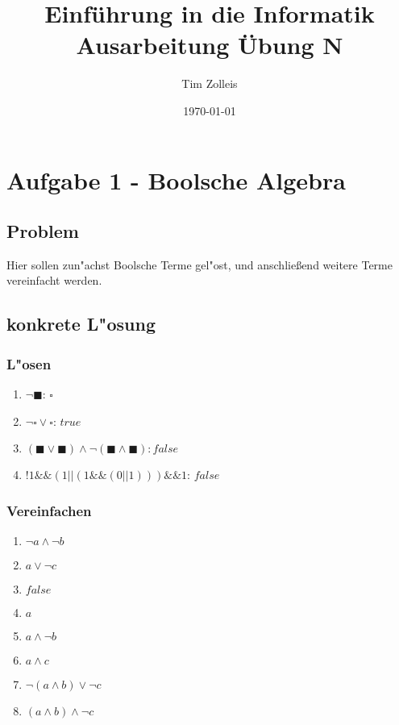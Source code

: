 \documentclass[a4paper,11pt,titlepage]{article}
\begin{document}
    \title{Einf\"uhrung in die Informatik\\
    Ausarbeitung \"Ubung N}


    \author{Tim Zolleis}

    \date{\today}

    \maketitle{\thispagestyle{plain}}


    \section{Aufgabe 1 - Boolsche Algebra}

    \subsection{Problem}
    Hier sollen zun"achst Boolsche Terme gel"ost, und anschließend weitere Terme vereinfacht werden.

    \subsection{konkrete L"osung}

    \subsubsection{L"osen}
    \begin{enumerate}
        \item $\neg \blacksquare$: $\square$
        \item $\neg \square \lor \square$: $true$
        \item $(\blacksquare \lor \blacksquare) \land \neg(\blacksquare \land \blacksquare): false$
        \item $!1\&\&(1||(1\&\&(0||1)))\&\&1$: $false$
    \end{enumerate}

    \subsubsection{Vereinfachen}
    \begin{enumerate}
        \item $\neg a \land \neg b$
        \item $a \lor \neg c$
        \item $false$
        \item $a$
        \item $a \land \neg b$
        \item $a \land c$
        \item $\neg (a \land b) \lor \neg c$
        \item $(a \land b) \land \neg c$
    \end{enumerate}
\end{document}
